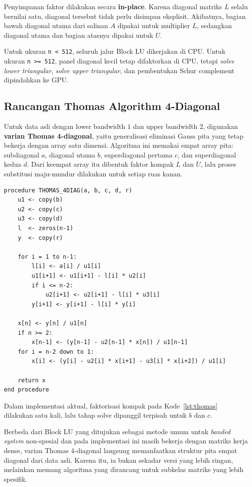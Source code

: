 \documentclass[12pt,a4paper]{article}
\begin{document}
Penyimpanan faktor dilakukan secara \textbf{in-place}. Karena diagonal matriks $L$ selalu bernilai satu, diagonal tersebut tidak perlu disimpan eksplisit. Akibatnya, bagian bawah diagonal utama dari salinan $A$ dipakai untuk multiplier $L$, sedangkan diagonal utama dan bagian atasnya dipakai untuk $U$.

Untuk ukuran \texttt{n < 512}, seluruh jalur Block LU dikerjakan di CPU. Untuk ukuran \texttt{n >= 512}, panel diagonal kecil tetap difaktorkan di CPU, tetapi \emph{solve lower triangular}, \emph{solve upper triangular}, dan pembentukan Schur complement dipindahkan ke GPU.

\subsection{Rancangan Thomas Algorithm 4-Diagonal}
Untuk data asli dengan lower bandwidth $1$ dan upper bandwidth $2$, digunakan \textbf{varian Thomas 4-diagonal}, yaitu generalisasi eliminasi Gauss pita yang tetap bekerja dengan array satu dimensi. Algoritma ini memakai empat array pita: subdiagonal $a$, diagonal utama $b$, superdiagonal pertama $c$, dan superdiagonal kedua $d$. Dari keempat array itu dibentuk faktor kompak $L$ dan $U$, lalu proses substitusi maju-mundur dilakukan untuk setiap ruas kanan.

\begin{lstlisting}[style=pseudo,caption={Pseudocode varian Thomas 4-diagonal.},label={lst:thomas}]
procedure THOMAS_4DIAG(a, b, c, d, r)
    u1 <- copy(b)
    u2 <- copy(c)
    u3 <- copy(d)
    l  <- zeros(n-1)
    y  <- copy(r)

    for i = 1 to n-1:
        l[i] <- a[i] / u1[i]
        u1[i+1] <- u1[i+1] - l[i] * u2[i]
        if i <= n-2:
            u2[i+1] <- u2[i+1] - l[i] * u3[i]
        y[i+1] <- y[i+1] - l[i] * y[i]

    x[n] <- y[n] / u1[n]
    if n >= 2:
        x[n-1] <- (y[n-1] - u2[n-1] * x[n]) / u1[n-1]
    for i = n-2 down to 1:
        x[i] <- (y[i] - u2[i] * x[i+1] - u3[i] * x[i+2]) / u1[i]

    return x
end procedure
\end{lstlisting}

Dalam implementasi aktual, faktorisasi kompak pada Kode~\ref{lst:thomas} dilakukan satu kali, lalu tahap solve dipanggil terpisah untuk $b$ dan $c$.

Berbeda dari Block LU yang ditujukan sebagai metode umum untuk \emph{banded system} non-spesial dan pada implementasi ini masih bekerja dengan matriks kerja dense, varian Thomas 4-diagonal langsung memanfaatkan struktur pita empat diagonal dari data asli. Karena itu, ia bukan sekadar versi yang lebih ringan, melainkan memang algoritma yang dirancang untuk subkelas matriks yang lebih spesifik.
\end{document}
